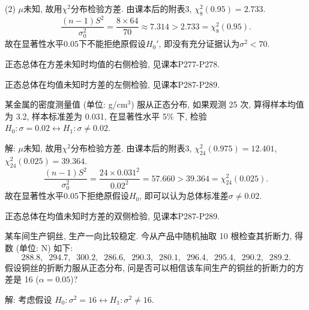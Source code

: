 \documentclass[standard]{ExBook}
\renewenvironment{shaded}{%
  \def\FrameCommand{\fboxsep=\FrameSep \colorbox{shadecolor}}%
  \MakeFramed{\advance\hsize-\width \FrameRestore}%
}{%
  \endMakeFramed
}
\begin{document}
\begin{qitems}
(2) $\mu$未知, 故用$\chi^2$分布检验方差. 由课本后的附表3, $\chi_8^2(0.95)=2.733$.
$$
\frac{(n-1)S^2}{\sigma_0^2}
=
\frac{8\times64}{70}
\approx
7.314
>
2.733
=
\chi_8^2(0.95).
$$
故在显著性水平$0.05$下不能拒绝原假设$H_0'$, 即没有充分证据认为$\sigma^2<70$.

\textcolor{themeColor}{\selectfont {} 正态总体在方差未知时均值的右侧检验, 见课本P277-P278.}

\textcolor{themeColor}{\selectfont {} 正态总体在均值未知时方差的左侧检验, 见课本P287-P289.}

\vspace{2.5cm-5em}

    \begin{bbox}
    \begin{shaded}
        \qitem
某金属的密度测量值 (单位: g/cm$^3$) 服从正态分布, 如果观测 25 次, 算得样本均值为 3.2, 样本标准差为 0.031, 在显著性水平 5\% 下, 检验 $H_0 : \sigma = 0.02 \longleftrightarrow H_1 : \sigma \neq 0.02$.
    \end{shaded}
    \end{bbox}

\vspace{\dimexpr2.5cm-5em\relax}

解: $\mu$未知, 故用$\chi^2$分布检验方差. 由课本后的附表3, $\chi_{24}^2(0.975)=12.401$, $\chi_{24}^2(0.025)=39.364$.
$$
\frac{(n-1)S^2}{\sigma_0^2}
=
\frac{24\times0.031^2}{0.02^2}
=
57.660
>
39.364
=
\chi_{24}^2(0.025).
$$
故在显著性水平$0.05$下拒绝原假设$H_0$, 即可以认为总体标准差$\sigma\neq0.02$.

\textcolor{themeColor}{\selectfont {} 正态总体在均值未知时方差的双侧检验, 见课本P287-P289.}

\vspace{2.5cm-5em}

    \begin{bbox}
    \begin{shaded}
        \qitem
某车间生产铜丝, 生产一向比较稳定. 今从产品中随机抽取 10 根检查其折断力, 得数 (单位: N) 如下:
$$288.8, \;\; 294.7, \;\; 300.2, \;\; 286.6, \;\; 290.3, \;\; 280.1, \;\; 296.4, \;\; 295.4, \;\; 290.2, \;\; 289.2.$$
假设铜丝的折断力服从正态分布, 问是否可以相信该车间生产的铜丝的折断力的方差是 16 ($\alpha = 0.05$)?
    \end{shaded}
    \end{bbox}

\vspace{\dimexpr2.5cm-5em\relax}

解: 考虑假设
$
H_0:\sigma^2=16
\longleftrightarrow
H_1:\sigma^2\neq16
$.


\end{qitems}
\end{document}
